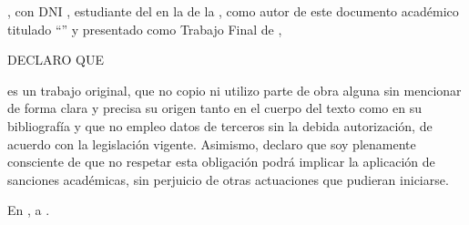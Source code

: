 \begin{titlepage}

\begin{center}
\large{\underline{\myAuthorPageTitle}}
\end{center}

\vspace{1.0cm}

\textbf{\myAuthor}, con DNI \textbf{\myAuthorDni}, estudiante del \textbf{\myCareerName} en la \mySchoolName de la \myUniversityName, como autor de este documento académico titulado ``\textbf{\myProjectName}'' y presentado como Trabajo Final de \myCareerType,

\vspace{.5cm}

\noindent DECLARO QUE

\vspace{.5cm}

\noindent es un trabajo original, que no copio ni utilizo parte de obra alguna sin mencionar de forma clara y precisa su origen tanto en el cuerpo del texto como en su bibliografía y que no empleo datos de terceros sin la debida autorización, de acuerdo con la legislación vigente. Asimismo, declaro que soy plenamente consciente de que no respetar esta obligación podrá implicar la aplicación de sanciones académicas, sin perjuicio de otras actuaciones que pudieran iniciarse.

\vspace{.5cm}

En \mySchoolLocation, a \myProjectDate. 

\end{titlepage}
